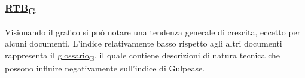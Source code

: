 \subsubsection*{\href{https://7last.github.io/docs/rtb/documentazione-interna/glossario\#requirements-and-technology-baseline}{RTB\textsubscript{G}}}
Visionando il grafico si può notare una tendenza generale di crescita, eccetto per alcuni documenti. L'indice relativamente basso rispetto agli altri documenti rappresenta il \href{https://7last.github.io/docs/rtb/documentazione-interna/glossario\#glossario}{glossario\textsubscript{G}}, il quale contiene descrizioni di natura tecnica che possono influire negativamente sull'indice di Gulpease.

\newpage
